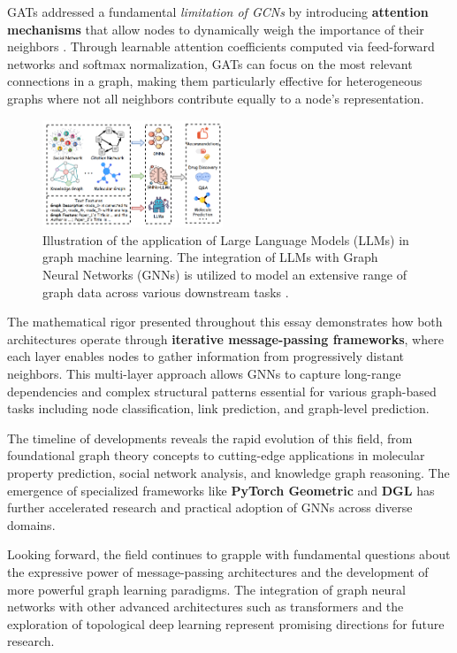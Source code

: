\documentclass{article}
\begin{document}
GATs addressed a fundamental \textit{limitation of GCNs} by introducing \textbf{attention mechanisms} that allow nodes to dynamically weigh the importance of their neighbors \cite{veličković2018graphattentionnetworks}.
Through learnable attention coefficients computed via feed-forward networks and softmax normalization, GATs can focus on the most relevant connections in a graph, making them particularly effective for heterogeneous graphs where not all neighbors contribute equally to a node's representation.

\begin{figure}
      \centering
      \includegraphics[width=0.48\textwidth]{../assets/gnn_applications.png}
      \caption{Illustration of the application of Large Language Models (LLMs) in graph machine learning. The integration of LLMs with Graph Neural Networks (GNNs) is utilized to model an extensive range of graph data across various downstream tasks \cite{fan2024graphmachinelearningera}.}
      \label{fig:gnn-applications}
\end{figure}

The mathematical rigor presented throughout this essay demonstrates how both architectures operate through \textbf{iterative message-passing frameworks}, where each layer enables nodes to gather information from progressively distant neighbors.
This multi-layer approach allows GNNs to capture long-range dependencies and complex structural patterns essential for various graph-based tasks including node classification, link prediction, and graph-level prediction.

The timeline of developments reveals the rapid evolution of this field, from foundational graph theory concepts to cutting-edge applications in molecular property prediction, social network analysis, and knowledge graph reasoning.
The emergence of specialized frameworks like \textbf{PyTorch Geometric} and \textbf{DGL} \cite{pytorch_geometric,dgl} has further accelerated research and practical adoption of GNNs across diverse domains.

Looking forward, the field continues to grapple with fundamental questions about the expressive power of message-passing architectures and the development of more powerful graph learning paradigms.
The integration of graph neural networks with other advanced architectures such as transformers and the exploration of topological deep learning represent promising directions for future research.




\end{document}
